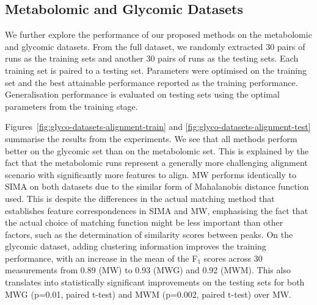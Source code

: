 
\subsection{Metabolomic and Glycomic Datasets}
\label{sub:Metabolomic-glycomic-experiments}

We further explore the performance of our proposed methods on the metabolomic and glycomic datasets. From the full dataset, we randomly extracted 30 pairs of runs as the training sets and another 30 pairs of runs as the testing sets. Each training set is paired to a testing set. Parameters were optimised on the training set and the best attainable performance reported as the training performance. Generalisation performance is evaluated on testing sets using the optimal parameters from the training stage.

Figures~\ref{fig:glyco-datasets-alignment-train} and \ref{fig:glyco-datasets-alignment-test} summarise the results from the experiments. We see that all methods perform better on the glycomic set than on the metabolomic set. This is explained by the fact that the metabolomic runs represent a generally more challenging alignment scenario with significantly more features to align. MW performs identically to SIMA on both datasets due to the similar form of Mahalanobis distance function used. This is despite the differences in the actual matching method that establishes feature correspondences in SIMA and MW, emphasising the fact that the actual choice of matching function might be less important than other factors, such as the determination of similarity scores between peaks. On the glycomic dataset, adding clustering information improves the training performance, with an increase in the mean of the F$_1$ scores across 30 measurements from 0.89 (MW) to 0.93 (MWG) and 0.92 (MWM). This also translates into statistically significant improvements on the testing sets for both MWG (p=0.01, paired t-test) and MWM (p=0.002, paired t-test) over MW.

